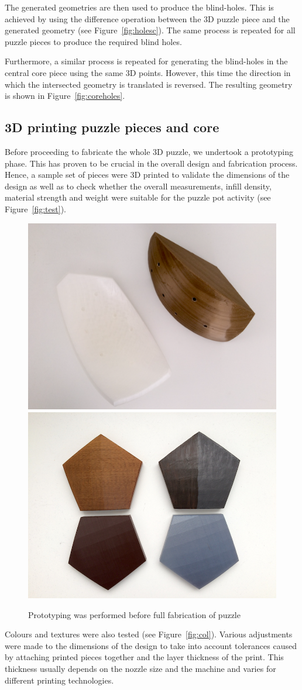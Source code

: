 \documentclass[acmlarge,screen,dvipsnames]{acmart}
\begin{document}
The generated geometries are then used to produce the
blind-holes. This is achieved by using the difference operation
between the 3D puzzle piece and the generated geometry (see
Figure~\ref{fig:holesc}). The same process is repeated for all puzzle
pieces to produce the required blind holes.

Furthermore, a similar process is repeated for generating the
blind-holes in the central core piece using the same 3D
points. However, this time the direction in which the intersected
geometry is translated is reversed. The resulting geometry is shown in
Figure~\ref{fig:coreholes}.

\subsection{3D printing puzzle pieces and core}

Before proceeding to fabricate the whole 3D puzzle, we undertook a
prototyping phase. This has proven to be crucial in the overall design
and fabrication process. Hence, a sample set of pieces were 3D printed
to validate the dimensions of the design as well as to check whether
the overall measurements, infill density, material strength and weight
were suitable for the puzzle pot activity (see Figure~\ref{fig:test}).
%
\begin{figure}[htb]
  \centering
  {\includegraphics[width=0.445\linewidth]{images/coreANDpiece}}
   {\includegraphics[width=0.446\linewidth]{images/colour}}

  \caption{
    Prototyping was performed before full fabrication of puzzle}
\end{figure}
%
Colours and textures were also tested (see
Figure~\ref{fig:col}). Various adjustments were made to the dimensions
of the design to take into account tolerances caused by attaching
printed pieces together and the layer thickness of the print. This
thickness usually depends on the nozzle size and the machine and
varies for different printing technologies.
\end{document}
